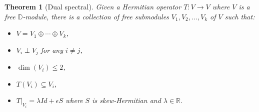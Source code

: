 \documentclass[
]{article}
\theoremstyle{theorem}
\newtheorem*{theorem}{Theorem}
\theoremstyle{proposition}
\begin{document}
\begin{theorem}[Dual spectral]
Given a Hermitian operator \(T: V \to V\) where \(V\) is a free \(\mathbb D\)-module, there is a collection of free submodules \(V_1, V_2, \dotsc, V_k\) of \(V\) such that:

\begin{itemize}
\item
  \(V = V_1 \oplus \dotsb \oplus V_k\),
\item
  \(V_i \perp V_j\) for any \(i \neq j\),
\item
  \(\dim(V_i) \leq 2\),
\item
  \(T(V_i) \subseteq V_i\),
\item
  \(T|_{V_i} = \lambda Id + \epsilon S\) where \(S\) is skew-Hermitian and \(\lambda \in \mathbb R\).
\end{itemize}
\end{theorem}
\end{document}

